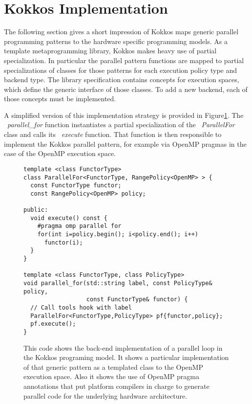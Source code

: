 \section{Kokkos Implementation}

The following section gives a short impression of Kokkos maps generic parallel programming patterns to the hardware specific programming models.
As a template metaprogramming library, Kokkos makes heavy use of partial specialization. 
In particular the parallel pattern functions are mapped to partial specializations of classes for those patterns for each execution policy type and backend type.
The library specification contains concepts for execution spaces, which define the generic interface of those classes.
To add a new backend, each of those concepts must be implemented.

A simplified version of this implementation strategy is provided in Figure\ref{fig:KokkosExampleOMPBackEnd}.
The ~\emph{parallel\_for} function instantiates a partial specialization of the ~\emph{ParallelFor} class and calls its ~\emph{execute} function.
That function is then responsible to implement the Kokkos parallel pattern, for example via OpenMP pragmas in the case of the OpenMP execution space.
\begin{figure}
\begin{small}
\begin{Verbatim}[frame=leftline]
template <class FunctorType>
class ParallelFor<FunctorType, RangePolicy<OpenMP> > {
  const FunctorType functor;
  const RangePolicy<OpenMP> policy; 

public:
  void execute() const {
    #pragma omp parallel for
    for(int i=policy.begin(); i<policy.end(); i++)
      functor(i);
  }
}

template <class FunctorType, class PolicyType>
void parallel_for(std::string label, const PolicyType& policy,
                  const FunctorType& functor) {
  // Call tools hook with label
  ParallelFor<FunctorType,PolicyType> pf{functor,policy};
  pf.execute();
}

\end{Verbatim}
\end{small}
\caption{This code shows the back-end implementation of a parallel loop in the Kokkos programing model. It shows a particular implementation of that generic pattern as a templated class to the OpenMP execution space. Also it shows the use of OpenMP pragma annotations that put platform compilers in charge to generate parallel code for the underlying hardware architecture.}
\label{fig:KokkosExampleOMPBackEnd}
\end{figure}


